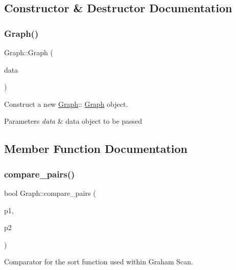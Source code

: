 \subsection{Constructor \& Destructor Documentation}
\mbox{\label{classGraph_ad2e96f43e60cd916a3bccab231fc7570}} 
\subsubsection{\texorpdfstring{Graph()}{Graph()}}
{\footnotesize\ttfamily Graph\+::\+Graph (\begin{DoxyParamCaption}\item[{\hyperlink{classData}{Data}}]{data }\end{DoxyParamCaption})}



Construct a new \hyperlink{classGraph}{Graph}\+:\+: \hyperlink{classGraph}{Graph} object. 


\begin{DoxyParams}{Parameters}
{\em data} & data object to be passed \\
\hline
\end{DoxyParams}


\subsection{Member Function Documentation}
\mbox{\label{classGraph_ad0d59e9ffd312e3af8bb37f567da3320}} 
\subsubsection{\texorpdfstring{compare\+\_\+pairs()}{compare\_pairs()}}
{\footnotesize\ttfamily bool Graph\+::compare\+\_\+pairs (\begin{DoxyParamCaption}\item[{pair$<$ \hyperlink{classNode}{Node}, double $>$}]{p1,  }\item[{pair$<$ \hyperlink{classNode}{Node}, double $>$}]{p2 }\end{DoxyParamCaption})\hspace{0.3cm}{\ttfamily [static]}}



Comparator for the sort function used within Graham Scan. 


